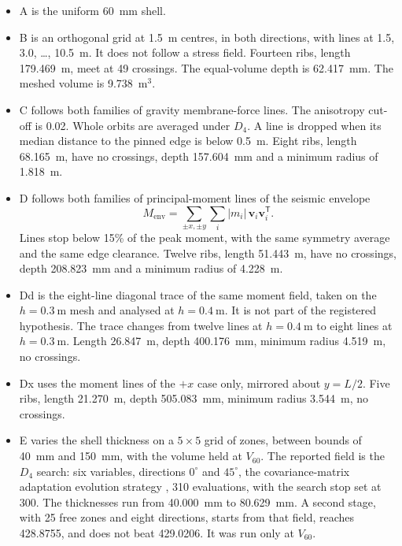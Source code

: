\documentclass[11pt,a4paper]{article}
\begin{document}
\begin{itemize}
\item A is the uniform 60~mm shell.
\item B is an orthogonal grid at 1.5~m centres, in both directions, with lines at 1.5, 3.0, \ldots, 10.5~m.
It does not follow a stress field.
Fourteen ribs, length 179.469~m, meet at 49 crossings.
The equal-volume depth is 62.417~mm.
The meshed volume is 9.738~m\(^{3}\).
\item C follows both families of gravity membrane-force lines.
The anisotropy cut-off is 0.02.
Whole orbits are averaged under \(D_4\).
A line is dropped when its median distance to the pinned edge is below 0.5~m.
Eight ribs, length 68.165~m, have no crossings, depth 157.604~mm and a minimum radius of 1.818~m.
\item D follows both families of principal-moment lines of the seismic envelope
\begin{equation}
M_{\mathrm{env}}
  = \sum_{\pm x,\pm y}\sum_{i} |m_i|\,\mathbf{v}_i\mathbf{v}_i^{\mathsf{T}}.
\label{eq:menv}
\end{equation}
Lines stop below 15\% of the peak moment, with the same symmetry average and the same edge clearance.
Twelve ribs, length 51.443~m, have no crossings, depth 208.823~mm and a minimum radius of 4.228~m.
\item Dd is the eight-line diagonal trace of the same moment field, taken on the \(h = 0.3~\mathrm{m}\) mesh and analysed at \(h = 0.4~\mathrm{m}\).
It is not part of the registered hypothesis.
The trace changes from twelve lines at \(h = 0.4~\mathrm{m}\) to eight lines at \(h = 0.3~\mathrm{m}\).
Length 26.847~m, depth 400.176~mm, minimum radius 4.519~m, no crossings.
\item Dx uses the moment lines of the \(+x\) case only, mirrored about \(y = L/2\).
Five ribs, length 21.270~m, depth 505.083~mm, minimum radius 3.544~m, no crossings.
\item E varies the shell thickness on a \(5\times 5\) grid of zones, between bounds of 40~mm and 150~mm, with the volume held at \(V_{60}\).
The reported field is the \(D_4\) search: six variables, directions \(0^{\circ}\) and \(45^{\circ}\), the covariance-matrix adaptation evolution strategy \citep{hansen2016}, 310 evaluations, with the search stop set at 300.
The thicknesses run from 40.000~mm to 80.629~mm.
A second stage, with 25 free zones and eight directions, starts from that field, reaches 428.8755, and does not beat 429.0206.
It was run only at \(V_{60}\).
\end{itemize}
\end{document}
